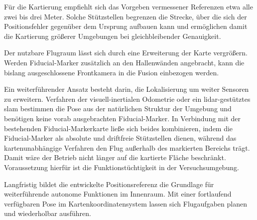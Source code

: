 Für die Kartierung empfiehlt sich das Vorgeben vermessener Referenzen etwa alle zwei bis drei Meter.
Solche Stützstellen begrenzen die Strecke, über die sich der Positionsfehler gegenüber dem Ursprung aufbauen kann und ermöglichen damit die Kartierung größerer Umgebungen bei gleichbleibender Genauigkeit.

Der nutzbare Flugraum lässt sich durch eine Erweiterung der Karte vergrößern.
Werden Fiducial-Marker zusätzlich an den Hallenwänden angebracht, kann die bislang ausgeschlossene Frontkamera in die Fusion einbezogen werden.

Ein weiterführender Ansatz besteht darin, die Lokalisierung um weiter Sensoren zu erweitern.
Verfahren der visuell-inertialen Odometrie oder ein \gls{lidar}-gestütztes \gls{slam} bestimmen die Pose aus der natürlichen Struktur der Umgebung und benötigen keine vorab ausgebrachten Fiducial-Marker.
In Verbindung mit der bestehenden Fiducial-Markerkarte ließe sich beides kombinieren, indem die Fiducial-Marker als absolute und driftfreie Stützstellen dienen, während das kartenunabhängige Verfahren den Flug außerhalb des markierten Bereichs trägt.
Damit wäre der Betrieb nicht länger auf die kartierte Fläche beschränkt. Voraussetzung hierfür ist die Funktionstüchtigkeit in der Versuchsumgebung.

Langfristig bildet die entwickelte Positionsreferenz die Grundlage für weiterführende autonome Funktionen im Innenraum.
Mit einer fortlaufend verfügbaren Pose im Kartenkoordinatensystem lassen sich Flugaufgaben planen und wiederholbar ausführen.